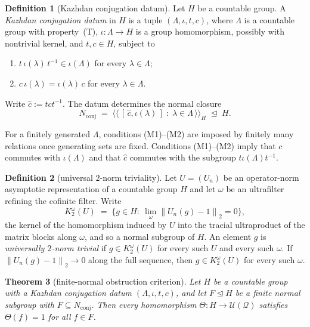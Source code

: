 \documentclass[11pt]{amsart}
\newcommand{\leanverified}[2]{\ignorespaces}
\newtheorem{theorem}{Theorem}[section]
\theoremstyle{definition}
\newtheorem{definition}[theorem]{Definition}
\theoremstyle{remark}
\theoremstyle{plain}
\newcommand{\U}{\mathcal U}
\newcommand{\hsnorm}[1]{\left\lVert #1\right\rVert_{2}}
\begin{document}
\begin{definition}[Kazhdan conjugation datum]\label{def:pattern}
Let $H$ be a countable group.  A \emph{Kazhdan conjugation datum} in
$H$ is a tuple $(\Lambda,\iota,t,c)$, where $\Lambda$ is a countable
group with property~\textup{(T)}, $\iota\colon\Lambda\to H$ is a group
homomorphism, possibly with nontrivial kernel, and $t,c\in H$,
subject to
\begin{enumerate}
  \item[(M1)] $t\,\iota(\lambda)\,t^{-1}\in\iota(\Lambda)$ for every
    $\lambda\in\Lambda$;
  \item[(M2)] $c\,\iota(\lambda)=\iota(\lambda)\,c$ for every
    $\lambda\in\Lambda$.
\end{enumerate}
Write $\hat c:=tct^{-1}$.  The datum determines the normal closure
\leanverified{Sofic/ConjugationDatumAnyUniverse}{GroupApproximation.ManuscriptExactWrappers.manuscriptMarkedKazhdanPattern_anyUniverse}
\[
  N_{\mathrm{conj}}
  \;=\;\bigl\langle\!\bigl\langle\,
  [\,\hat c,\iota(\lambda)\,]\;:\;\lambda\in\Lambda
  \,\bigr\rangle\!\bigr\rangle_H\;\trianglelefteq\;H .
\]
\end{definition}

For a finitely generated $\Lambda$, conditions (M1)--(M2) are imposed by
finitely many relations once generating sets are fixed.  Conditions
(M1)--(M2) imply that $c$ commutes with $\iota(\Lambda)$ and that $\hat c$
commutes with the subgroup $t\iota(\Lambda)t^{-1}$.

\begin{definition}[universal $2$-norm triviality]\label{def:invisible}
Let $U=(U_n)$ be an operator-norm asymptotic representation of a
countable group $H$ and let $\omega$ be an ultrafilter refining the
cofinite filter.  Write
\[
 K_2^{\omega}(U)\;=\;\bigl\{g\in H:\
 \textstyle\lim_\omega\hsnorm{U_n(g)-1}=0\bigr\},
\]
the kernel of the homomorphism induced by $U$ into the tracial
ultraproduct of the matrix blocks along $\omega$, and so a normal
subgroup of $H$.  An element $g$ is \emph{universally $2$-norm trivial} if
$g\in K_2^{\omega}(U)$ for every such $U$ and every such $\omega$.
If $\hsnorm{U_n(g)-1}\to0$ along the full sequence, then
$g\in K_2^{\omega}(U)$ for every such $\omega$.
\leanverified{Sofic/ManuscriptExactWrappers}{GroupApproximation.ManuscriptExactWrappers.manuscriptHSInvisibleCharacterization}
\end{definition}

\begin{theorem}[finite-normal obstruction criterion]\label{thm:criterion}
Let $H$ be a countable group with a Kazhdan conjugation datum
$(\Lambda,\iota,t,c)$, and let $F\trianglelefteq H$ be a finite
normal subgroup with $F\subseteq N_{\mathrm{conj}}$.  Then every
homomorphism $\Theta\colon H\to\U(\mathcal Q)$ satisfies
$\Theta(f)=1$ for all $f\in F$.
\leanverified{Sofic/FiniteNormalAnyUniverse}{GroupApproximation.ManuscriptExactWrappers.manuscriptFiniteNormalObstructionCriterion_anyUniverse}
\end{theorem}
\end{document}
